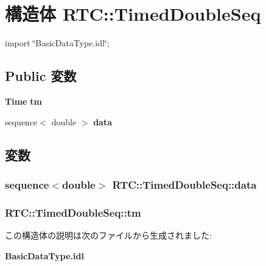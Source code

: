 \section{構造体 RTC::TimedDoubleSeq}
\label{structRTC_1_1TimedDoubleSeq}


{\ttfamily import \char`\"{}BasicDataType.idl\char`\"{};}

\subsection*{Public 変数}
\begin{DoxyCompactItemize}
\item 
{\bf Time} {\bf tm}
\item 
sequence$<$ double $>$ {\bf data}
\end{DoxyCompactItemize}


\subsection{変数}
\subsubsection[{data}]{\setlength{\rightskip}{0pt plus 5cm}sequence$<$double$>$ {\bf RTC::TimedDoubleSeq::data}}\label{structRTC_1_1TimedDoubleSeq_ac1f55e29d8e54d08da33d6d81c6309fc}
\subsubsection[{tm}]{ {\bf RTC::TimedDoubleSeq::tm}}\label{structRTC_1_1TimedDoubleSeq_aa157419b7a22afc914c73e6958003925}


この構造体の説明は次のファイルから生成されました:\begin{DoxyCompactItemize}
\item 
{\bf BasicDataType.idl}\end{DoxyCompactItemize}

